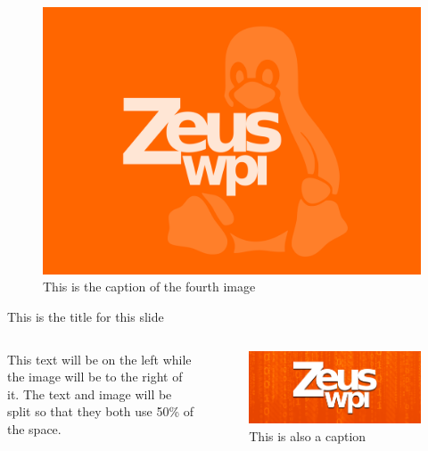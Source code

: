 \documentclass{beamer}
\begin{document}
\begin{frame}[plain, c]
    \begin{figure}
        \includegraphics[width=\linewidth]{image4.png}
        \caption{This is the caption of the fourth image}
    \end{figure}
\end{frame}
\begin{frame}[plain, c]{This is the title for this slide}
    \begin{columns}[c]
        This text will be on the left while the image will be to the right of it.
        The text and image will be split so that they both use 50\% of the space.
        \begin{figure}
            \includegraphics[width=\linewidth]{image5.png}
            \caption{This is also a caption}
        \end{figure}
    \end{columns}
\end{frame}
\end{document}
